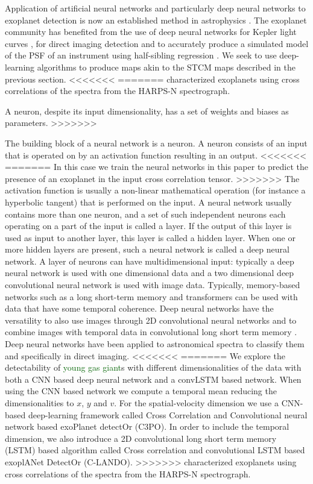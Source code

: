 \documentclass{aa}
\newcommand{\newchange}[1]{\textcolor{darkgreen}{#1}}
\begin{document}
{{Application of artificial neural networks and particularly deep neural networks to exoplanet detection is now an established method in astrophysics \citep[][]{2020Fluke}.
The exoplanet community has benefited from the use of deep neural networks for Kepler light curves \cite{2018Pearson}, for direct imaging detection \cite{2018Gomez} and to accurately produce a simulated model of the PSF of an instrument using half-sibling regression \citep{2022Gebhard}.
We seek to use deep-learning algorithms to produce maps akin to the STCM maps described in the previous section.
<<<<<<<
=======
\citet{2020Fisher} characterized exoplanets using cross correlations of the spectra from the HARPS-N spectrograph.

A neuron, despite its input dimensionality, has a set of weights and biases as parameters. 
>>>>>>>

The building block of a neural network is a neuron.
A neuron consists of an input that is operated on by an activation function resulting in an output.
<<<<<<<
=======
In this case we train the neural networks in this paper to predict the presence of an exoplanet in the input cross correlation tensor.
>>>>>>>
The activation function is usually a non-linear mathematical operation (for instance a hyperbolic tangent) that is performed on the input.
A neural network usually contains more than one neuron, and a set of such independent neurons each operating on a part of the input is called a layer. 
If the output of this layer is used as input to another layer, this layer is called a hidden layer.
When one or more hidden layers are present, such a neural network is called a deep neural network.
A layer of neurons can have multidimensional input: typically a deep neural network is used with one dimensional data and a two dimensional deep convolutional neural network is used with image data.
Typically, memory-based networks such as a long short-term memory and transformers can be used with data that have some temporal coherence.
Deep neural networks have the versatility to also use images through 2D convolutional neural networks \citep[CNN,][]{shi2015convolutional} and to combine images with temporal data in convolutional long short term memory \citep[convLSTM,][]{1997HocherieterLSTM,2022convLSTM}.
Deep neural networks have been applied to astronomical spectra \citep[e.g.,][]{2019Leung,2020Tao} to classify them and specifically in direct imaging.
<<<<<<<
=======
We explore the detectability of \newchange{young gas giant}s with different dimensionalities of the data with both a CNN based deep neural network and a convLSTM based network.
When using the CNN based network we compute a temporal mean reducing the dimensionalities to $x$, $y$ and $v$.
For the spatial-velocity dimension we use a CNN-based deep-learning framework called Cross Correlation and Convolutional neural network based exoPlanet detectOr (C3PO).
In order to include the temporal dimension, we also introduce a 2D convolutional long short term memory (LSTM) based algorithm called Cross correlation and convolutional LSTM based exoplANet DetectOr (C-LANDO).
>>>>>>>
\citet{2020Fisher} characterized exoplanets using cross correlations of the spectra from the HARPS-N spectrograph.

}}
\end{document}
